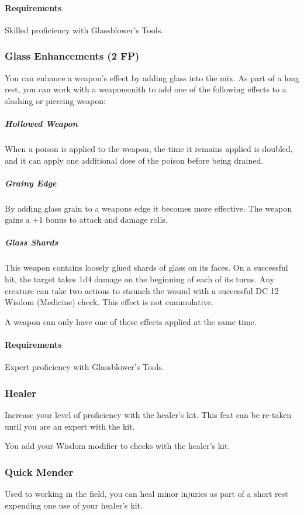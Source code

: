     \paragraph{Requirements} Skilled proficiency with Glassblower's Tools.
\subsubsection{Glass Enhancements (2 FP)} \label{feat::glassenhancement}
    You can enhance a weapon's effect by adding glass into the mix.
    As part of a long rest, you can work with a weaponsmith to add one of the following effects to a slashing or piercing weapon:
    \subparagraph{Hollowed Weapon} When a poison is applied to the weapon, the time it remains applied is doubled, and it can apply one additional dose of the poison before being drained.
    \subparagraph{Grainy Edge} By adding glass grain to a weapons edge it becomes more effective.
    The weapon gains a +1 bonus to attack and damage rolls.
    \subparagraph{Glass Shards} This weapon contains loosely glued shards of glass on its faces.
    On a successful hit, the target takes 1d4 damage on the beginning of each of its turns.
    Any creature can take two actions to staunch the wound with a successful DC 12 Wisdom (Medicine) check.
    This effect is not cummulative.

    A weapon can only have one of these effects applied at the same time.
    \paragraph{Requirements} Expert proficiency with Glassblower's Tools.

\subsubsection{Healer} \label{feat::healer}
    Increase your level of proficiency with the healer's kit.
    This feat can be re-taken until you are an expert with the kit.

    You add your Wisdom modifier to checks with the healer's kit.
\subsubsection{Quick Mender} \label{feat::quickmender}
    Used to working in the field, you can heal minor injuries as part of a short rest expending one use of your healer's kit.

